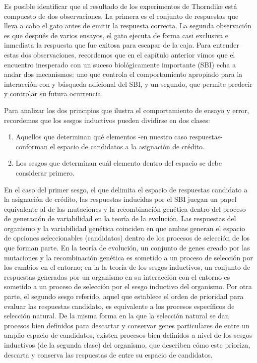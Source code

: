 \documentclass[
  a4paper,
  DIV=11,
  numbers=noendperiod]{scrreprt}
\begin{document}
Es posible identificar que el resultado de los experimentos de Thorndike
está compuesto de dos observaciones. La primera es el conjunto de
respuestas que lleva a cabo el gato antes de emitir la respuesta
correcta. La segunda observación es que después de varios ensayos, el
gato ejecuta de forma casi exclusiva e inmediata la respuesta que fue
exitosa para escapar de la caja. Para entender estas dos observaciones,
recordemos que en el capítulo anterior vimos que el encuentro inesperado
con un suceso biológicamente importante (SBI) echa a andar dos
mecanismos: uno que controla el comportamiento apropiado para la
interacción con y búsqueda adicional del SBI, y un segundo, que permite
predecir y controlar su futura ocurrencia.

Para analizar los dos principios que ilustra el comportamiento de ensayo
y error, recordemos que los sesgos inductivos pueden dividirse en dos
clases:

\begin{enumerate}
\def\labelenumi{\arabic{enumi}.}
\item
  Aquellos que determinan qué elementos -en nuestro caso respuestas-
  conforman el espacio de candidatos a la asignación de crédito.
\item
  Los sesgos que determinan cuál elemento dentro del espacio se debe
  considerar primero.
\end{enumerate}

En el caso del primer sesgo, el que delimita el espacio de respuestas
candidato a la asignación de crédito, las respuestas inducidas por el
SBI juegan un papel equivalente al de las mutaciones y la recombinación
genética dentro del proceso de generación de variabilidad en la teoría
de la evolución. Las respuestas del organismo y la variabilidad genética
coinciden en que ambas generan el espacio de opciones seleccionables
(candidatos) dentro de los procesos de selección de los que forman
parte. En la teoría de evolución, un conjunto de genes creado por las
mutaciones y la recombinación genética es sometido a un proceso de
selección por los cambios en el entorno; en la la teoría de los sesgos
inductivos, un conjunto de respuestas generadas por un organismo en su
interacción con el entorno es sometido a un proceso de selección por el
sesgo inductivo del organismo. Por otra parte, el segundo sesgo
referido, aquel que establece el orden de prioridad para evaluar las
respuestas candidato, es equivalente a los procesos específicos de
selección natural. De la misma forma en la que la selección natural se
dan procesos bien definidos para descartar y conservar genes
particulares de entre un amplio espacio de candidatos, existen procesos
bien definidos a nivel de los sesgos inductivos (de la segunda clase)
del organismo, que describen cómo este prioriza, descarta y conserva las
respuestas de entre su espacio de candidatos.
\end{document}
